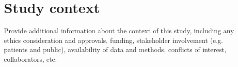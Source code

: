 \documentclass[11pt]{article}
\begin{document}
\section{Study context}
Provide additional information about the context of this study, including any ethics consideration and approvals, funding, stakeholder involvement (e.g. patients and public), availability of data and methods, conflicts of interest, collaborators, etc.



\end{document}
